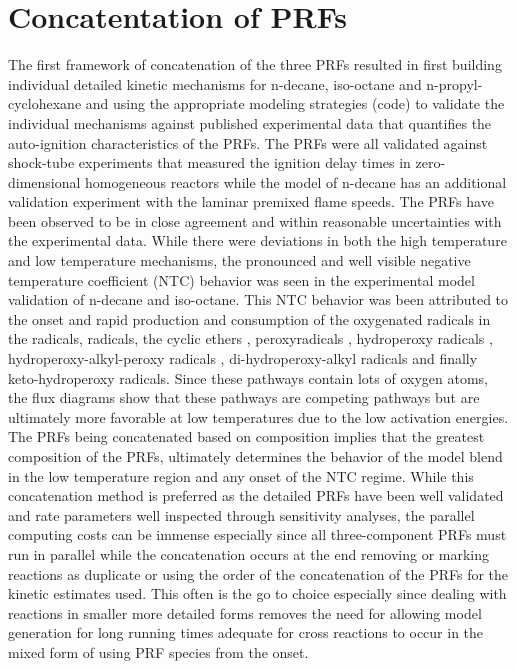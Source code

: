 \section{Concatentation of PRFs }
The first framework of concatenation of the three PRFs resulted in first building individual detailed kinetic mechanisms for n-decane, iso-octane and n-propyl-cyclohexane and using the appropriate modeling strategies (code) to validate the individual mechanisms against published experimental data that quantifies the auto-ignition characteristics of the PRFs. The PRFs were all validated against shock-tube experiments that measured the ignition delay times in zero-dimensional homogeneous reactors while the model of n-decane has an additional validation experiment with the laminar premixed flame speeds. The PRFs have been observed to be in close agreement and within reasonable uncertainties with the experimental data. While there were deviations in both the high temperature and low temperature mechanisms, the pronounced and well visible negative temperature coefficient (NTC) behavior was seen in the experimental model validation of n-decane and iso-octane. This NTC behavior was been attributed to the onset and rapid production and consumption of the oxygenated radicals in the  radicals,  radicals, the cyclic ethers , peroxyradicals , hydroperoxy radicals , hydroperoxy-alkyl-peroxy radicals , di-hydroperoxy-alkyl radicals  and finally keto-hydroperoxy radicals. Since these pathways contain lots of oxygen atoms, the flux diagrams show that these pathways are competing pathways but are ultimately more favorable at low temperatures due to the low activation energies. The PRFs being concatenated based on composition implies that the greatest composition of the PRFs, ultimately determines the behavior of the model blend in the low temperature region and any onset of the NTC regime. While this concatenation method is preferred as the detailed PRFs have been well validated and rate parameters well inspected through sensitivity analyses, the parallel computing costs can be immense especially since all three-component PRFs must run in parallel while the concatenation occurs at the end removing or marking reactions as duplicate or using the order of the concatenation of the PRFs for the kinetic estimates used. This often is the go to choice especially since dealing with reactions in smaller more detailed forms removes the need for allowing model generation for long running times adequate for cross reactions to occur in the mixed form of using PRF species from the onset.




